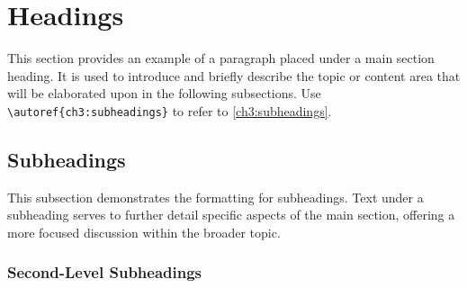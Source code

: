 


\section{Headings}
\label{ch3:headings}

\begin{paragraph}
This section provides an example of a paragraph placed under a main section heading. It is used to introduce and briefly describe the topic 
or content area that will be elaborated upon in the following subsections. Use \verb|\autoref{ch3:subheadings}| to refer to \autoref{ch3:subheadings}.
\end{paragraph}

\subsection{Subheadings}
\label{ch3:subheadings}

\begin{subparagraph}
This subsection demonstrates the formatting for subheadings. Text under a subheading serves to further detail specific aspects of the main section, offering a more focused discussion within the broader topic.
\end{subparagraph}

\subsubsection{Second-Level Subheadings}
\label{ch3:subsub:example}

